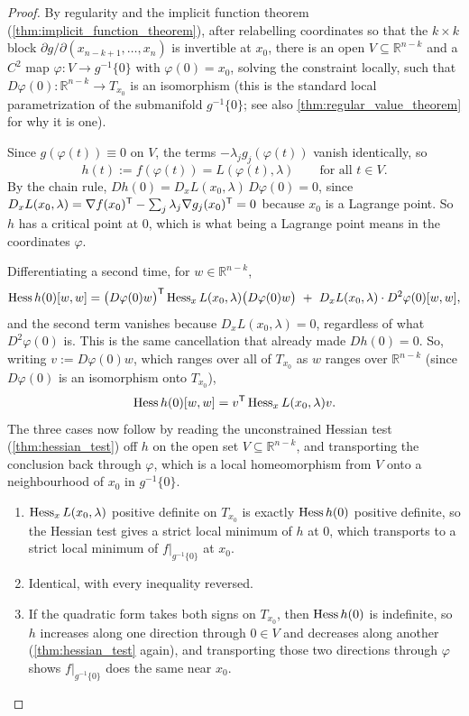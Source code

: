 \begin{proof}
By regularity and the implicit function theorem (\cref{thm:implicit_function_theorem}), after
relabelling coordinates so that the $k\times k$ block $\partial g/\partial(x_{n-k+1},\dots,x_n)$
is invertible at $x_0$, there is an open $V \subseteq \mathbb{R}^{n-k}$ and a $C^2$ map
$\varphi : V \to g^{-1}\{0\}$ with $\varphi(0) = x_0$, solving the constraint locally, such that
$D\varphi(0) : \mathbb{R}^{n-k} \to T_{x_0}$ is an isomorphism (this is the standard local
parametrization of the submanifold $g^{-1}\{0\}$; see also
\cref{thm:regular_value_theorem} for why it is one).

Since $g(\varphi(t)) \equiv 0$ on $V$, the terms $-\lambda_jg_j(\varphi(t))$ vanish identically,
so
\[h(t) := f(\varphi(t)) = L(\varphi(t),\lambda) \qquad \text{for all } t \in V.\]
By the chain rule, $Dh(0) = D_xL(x_0,\lambda)\,D\varphi(0) = 0$, since
$D_xL(x_0,\lambda) = \nabla f(x_0)^{\mathsf{T}} - \sum_j\lambda_j\nabla g_j(x_0)^{\mathsf{T}} = 0$ because
$x_0$ is a Lagrange point. So $h$ has a critical point at $0$, which is what being a Lagrange
point means in the coordinates $\varphi$.

Differentiating a second time, for $w \in \mathbb{R}^{n-k}$,
\[\operatorname{Hess} h(0)[w,w] = \big(D\varphi(0)w\big)^{\mathsf{T}}\operatorname{Hess}_xL(x_0,\lambda)\big(D\varphi(0)w\big)
  \ +\ D_xL(x_0,\lambda)\cdot D^2\varphi(0)[w,w],\]
and the second term vanishes because $D_xL(x_0,\lambda)=0$, regardless of what
$D^2\varphi(0)$ is. This is the same cancellation that already made $Dh(0)=0$. So, writing
$v := D\varphi(0)w$, which ranges over all of $T_{x_0}$ as $w$ ranges over $\mathbb{R}^{n-k}$
(since $D\varphi(0)$ is an isomorphism onto $T_{x_0}$),
\[\operatorname{Hess} h(0)[w,w] = v^{\mathsf{T}}\operatorname{Hess}_xL(x_0,\lambda)v.\]
The three cases now follow by reading the unconstrained Hessian test (\cref{thm:hessian_test})
off $h$ on the open set $V \subseteq \mathbb{R}^{n-k}$, and transporting the conclusion back
through $\varphi$, which is a local homeomorphism from $V$ onto a neighbourhood of $x_0$ in
$g^{-1}\{0\}$.
\begin{enumerate}[label=\textbf{(\alph*)}]
  \item $\operatorname{Hess}_xL(x_0,\lambda)$ positive definite on $T_{x_0}$ is exactly $\operatorname{Hess} h(0)$ positive
    definite, so the Hessian test gives a strict local minimum of $h$ at $0$, which transports
    to a strict local minimum of $f|_{g^{-1}\{0\}}$ at $x_0$.
  \item Identical, with every inequality reversed.
  \item If the quadratic form takes both signs on $T_{x_0}$, then $\operatorname{Hess} h(0)$ is indefinite, so
    $h$ increases along one direction through $0 \in V$ and decreases along another
    (\cref{thm:hessian_test} again), and transporting those two directions through $\varphi$
    shows $f|_{g^{-1}\{0\}}$ does the same near $x_0$.
\end{enumerate}
\end{proof}

